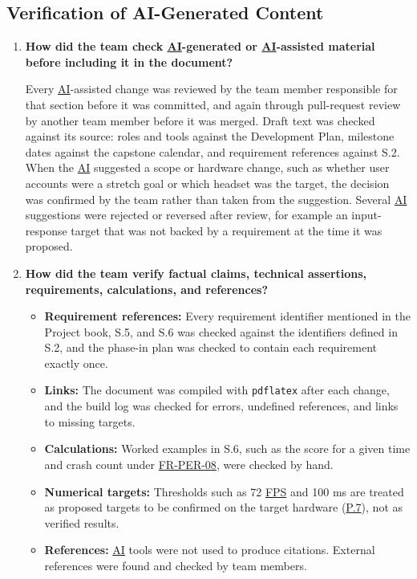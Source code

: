 \documentclass[12pt]{article}
\begin{document}
\subsection*{Verification of AI-Generated Content}

\begin{enumerate}
    \item \textbf{How did the team check \hyperlink{glos:AI}{AI}-generated or \hyperlink{glos:AI}{AI}-assisted material
    before including it in the document?}

    Every \hyperlink{glos:AI}{AI}-assisted change was reviewed by the team member responsible for
    that section before it was committed, and again through pull-request
    review by another team member before it was merged. Draft text was
    checked against its source: roles and tools against the Development Plan,
    milestone dates against the capstone calendar, and requirement references
    against S.2. When the \hyperlink{glos:AI}{AI} suggested a scope or hardware change, such as
    whether user accounts were a stretch goal or which headset was the target,
    the decision was confirmed by the team rather than taken from the
    suggestion. Several \hyperlink{glos:AI}{AI} suggestions were rejected or reversed after review,
    for example an input-response target that was not backed by a requirement
    at the time it was proposed.

    \item \textbf{How did the team verify factual claims, technical
    assertions, requirements, calculations, and references?}

    \begin{itemize}
        \item \textbf{Requirement references:} Every requirement identifier
        mentioned in the Project book, S.5, and S.6 was checked against the
        identifiers defined in S.2, and the phase-in plan was checked to
        contain each requirement exactly once.
        \item \textbf{Links:} The document was compiled with \texttt{pdflatex}
        after each change, and the build log was checked for errors, undefined
        references, and links to missing targets.
        \item \textbf{Calculations:} Worked examples in S.6, such as the score
        for a given time and crash count under
        \hyperlink{req:FR-PER-08}{FR-PER-08}, were checked by hand.
        \item \textbf{Numerical targets:} Thresholds such as 72 \hyperlink{glos:FPS}{FPS} and 100 ms
        are treated as proposed targets to be confirmed on the target hardware
        (\hyperref[p7]{P.7}), not as verified results.
        \item \textbf{References:} \hyperlink{glos:AI}{AI} tools were not used to produce
        citations. External references were found and checked by team
        members.
    \end{itemize}


\end{enumerate}
\end{document}
